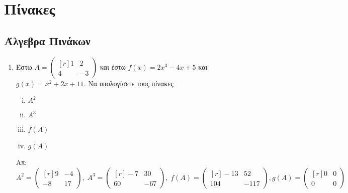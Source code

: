 



\geometry{top=2cm}

\pagestyle{askhseis}



\chapter*{Πίνακες}

\section*{Άλγεβρα Πινάκων}

\begin{enumerate}

\item Έστω $ A = 
  \begin{pmatrix*}[r]
    1 & 2 \\
    4 & -3
  \end{pmatrix*} $ και έστω $ f(x) = 2x^{3}-4x+5 $ και $ g(x) = x^{2}+2x+11 $. Να 
  υπολογίσετε τους πίνακες 
  \begin{enumerate}[i)]
    \item $ A^{2} $
    \item $ A^{3} $
    \item $ f(A) $
    \item $ g(A) $
  \end{enumerate}

  \hfill Απ: $ A^{2} = 
  \begin{pmatrix*}[r]
    9 & -4 \\
    -8 & 17
  \end{pmatrix*}, \; A^{3} = 
  \begin{pmatrix*}[r]
    -7 & 30 \\
    60 & -67
  \end{pmatrix*}, \; f(A) = 
  \begin{pmatrix*}[r]
    -13 & 52 \\
    104 & -117
  \end{pmatrix*}, g(A) = 
  \begin{pmatrix*}[r]
    0 & 0 \\
    0 & 0 
  \end{pmatrix*} $ 


\end{enumerate}

